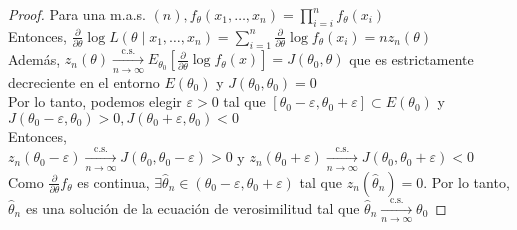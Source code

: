 \begin{proof}
Para una m.a.s. $(n), f_{\theta}\left(x_{1}, \ldots, x_{n}\right)=\prod_{i=i}^{n} f_{\theta}\left(x_{i}\right)$\\
Entonces, $\frac{\partial}{\partial \theta} \log L\left(\theta \mid x_{1}, \ldots, x_{n}\right)=\sum_{i=1}^{n} \frac{\partial}{\partial \theta} \log f_{\theta}\left(x_{i}\right)=n z_{n}(\theta)$\\
Además, $z_{n}(\theta) \xrightarrow[n \rightarrow \infty]{\text { c.s. }} E_{\theta_{0}}\left[\frac{\partial}{\partial \theta} \log f_{\theta}(x)\right]=J\left(\theta_{0}, \theta\right)$ que es estrictamente decreciente en el entorno $E\left(\theta_{0}\right)$ y $J\left(\theta_{0}, \theta_{0}\right)=0$\\
Por lo tanto, podemos elegir $\varepsilon>0$ tal que $\left[\theta_{0}-\varepsilon, \theta_{0}+\varepsilon\right] \subset E\left(\theta_{0}\right)$ y $J\left(\theta_{0}-\varepsilon, \theta_{0}\right)>0, J\left(\theta_{0}+\varepsilon, \theta_{0}\right)<0$\\
Entonces,\\
$z_{n}\left(\theta_{0}-\varepsilon\right) \xrightarrow[n \rightarrow \infty]{\text { c.s. }} J\left(\theta_{0}, \theta_{0}-\varepsilon\right)>0$ y $z_{n}\left(\theta_{0}+\varepsilon\right) \xrightarrow[n \rightarrow \infty]{\text { c.s. }} J\left(\theta_{0}, \theta_{0}+\varepsilon\right)<0$\\
Como $\frac{\partial}{\partial \theta} f_{\theta}$ es continua, $\exists \hat{\theta}_{n} \in\left(\theta_{0}-\varepsilon, \theta_{0}+\varepsilon\right)$ tal que $z_{n}\left(\hat{\theta}_{n}\right)=0$. Por lo tanto, $\hat{\theta}_{n}$ es una solución de la ecuación de verosimilitud tal que $\hat{\theta}_{n} \xrightarrow[n \rightarrow \infty]{\text { c.s. }} \theta_{0}$
\end{proof}


